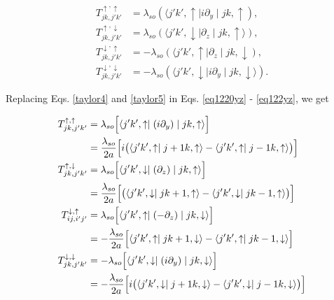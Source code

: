 \documentclass[10pt,prb,showpacs,amssymb,floatfix]{revtex4-1}
\newcommand{\nn}{\nonumber}
\begin{document}
\begin{align}
\label{eq1220yz}
T_{jk,j'k'}^{\uparrow,\uparrow} &= \lambda_{so}(\langle j'k',\uparrow \mid i\partial_y\mid jk,\uparrow) , \\
\label{eq1221yz}
T_{jk,j'k'}^{\uparrow,\downarrow} &=  \lambda_{so}(\langle j'k',\downarrow \mid \partial_z \mid jk,\uparrow \rangle), \\
\label{eq1222yz}
T_{jk,j'k'}^{\downarrow,\uparrow} &= -\lambda_{so}(  \langle j'k',\uparrow \mid \partial_z \mid jk,\downarrow), \\
T_{jk,j'k'}^{\downarrow,\downarrow} &=  -  \lambda_{so}(\langle j'k',\downarrow \mid i \partial_y \mid jk,\downarrow \rangle).
\label{eq122yz}
\end{align}

 
Replacing Eqs. \eqref{taylor4} and \eqref{taylor5} in Eqs. \eqref{eq1220yz} - \eqref{eq122yz}, we get

\begin{align}
\label{eq1221ayz}
T_{jk,j'k'}^{\uparrow,\uparrow} &= \lambda_{so} \Big{[} \langle j'k',\uparrow \mid (i\partial_y) \mid jk,\uparrow \rangle \Big{]} \nn\\
&= \frac{\lambda_{so}}{2a} \Big{[} i \big{(} \langle j'k',\uparrow \mid  j+1k,\uparrow \rangle - \langle j'k',\uparrow \mid j-1k,\uparrow \rangle \big{)}  \Big{]} \\
T_{jk,j'k'}^{\uparrow,\downarrow} &= \lambda_{so} \Big{[} \langle j'k',\downarrow \mid (\partial_z) \mid jk,\uparrow \rangle \Big{]} \nn\\
&= \frac{\lambda_{so}}{2a} \Big{[}  \big{(} \langle j'k',\downarrow \mid  jk+1,\uparrow \rangle - \langle j'k',\downarrow \mid jk-1,\uparrow \rangle \big{)} \Big{]} \\
T_{ij,i'j'}^{\downarrow,\uparrow} &= \lambda_{so} \Big{[} \langle j'k',\uparrow \mid (-\partial_z) \mid jk,\downarrow \rangle  \Big{]} \nn\\
&= -\frac{\lambda_{so}}{2a} \Big{[} \langle j'k',\uparrow \mid jk+1,\downarrow \rangle -  \langle j'k',\uparrow \mid jk-1,\downarrow \rangle  \Big{]}\\
T_{jk,j'k'}^{\downarrow,\downarrow} &= -\lambda_{so} \Big{[} \langle j'k',\downarrow \mid (i\partial_y) \mid jk,\downarrow \rangle \Big{]} \nn\\
&= -\frac{\lambda_{so}}{2a} \Big{[} i \big{(} \langle j'k',\downarrow \mid  j+1k,\downarrow \rangle - \langle j'k',\downarrow \mid j-1k,\downarrow \rangle \big{)}  \Big{]}
\label{eq122ayz}
\end{align}
\end{document}
